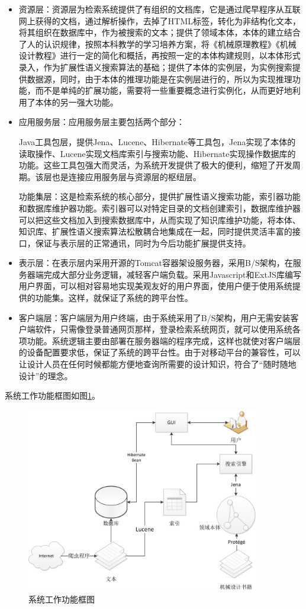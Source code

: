 \documentclass[12pt,a4paper]{article}
\begin{document}
	\begin{itemize}
	 	\item
	资源层：资源层为检索系统提供了有组织的文档库，它是通过爬早程序从互联网上获得的文档，通过解析操作，去掉了HTML标签，转化为非结构化文本，将其组织在数据库中，作为被搜索的文本；提供了领域本体，本体的建立结合了人的认识规律，按照本科教学的学习培养方案，将《机械原理教程》《机械设计教程》进行一定的简化和概括，再按照一定的本体构建规则，以本体形式录入，作为扩展性语义搜索算法的基础；提供了本体的实例层，为实例搜索提供数据源，同时，由于本体的推理功能是在实例层进行的，所以为实现推理功能，而不是单纯的扩展功能，需要将一些重要概念进行实例化，从而更好地利用了本体的另一强大功能。
		\item
	应用服务层：应用服务层主要包括两个部分：
	
	Java工具包层，提供Jena、Lucene、Hibernate等工具包，Jena实现了本体的读取操作、Lucene实现文档库索引与搜索功能、Hibernate实现操作数据库的功能。这些工具包强大而灵活，为系统开发提供了极大的便利，缩短了开发周期。该层也是连接应用服务层与资源层的枢纽层。
	
	功能集层：这是检索系统的核心部分，提供扩展性语义搜索功能，索引器功能和数据库维护器功能。索引器可以对特定目录的文档创建索引，数据库维护器可以把这些文档加入到搜索数据库中，从而实现了知识库维护功能，将本体、知识库、扩展性语义搜索算法松散耦合地集成在一起，同时提供灵活丰富的接口，保证与表示层的正常通讯，同时为今后功能扩展提供支持。
		\item
	表示层：在表示层内采用开源的Tomcat容器架设服务器，采用B/S架构，在服务器端完成大部分业务逻辑，减轻客户端负载。采用Javascript和ExtJS库编写用户界面，可以相对容易地实现美观友好的用户界面，使用户便于使用系统提供的功能集。这样，就保证了系统的跨平台性。
		\item
	客户端层：客户端层为用户终端，由于系统采用了B/S架构，用户无需安装客户端软件，只需像登录普通网页那样，登录检索系统网页，就可以使用系统各项功能。系统逻辑主要由部署在服务器端的程序完成，这样也就使对客户端层的设备配置要求低，保证了系统的跨平台性。由于对移动平台的兼容性，可以让设计人员在任何时候都能方便地查询所需要的设计知识，符合了“随时随地设计”的理念。
	
	\end{itemize}
	
	系统工作功能框图如图\ref{fig:功能框图}。
	
	\begin{figure}[htbp] 
	\centering\includegraphics[width=4in]{fig/功能框图.jpg} 
	\caption{系统工作功能框图}\label{fig:功能框图} 
	\end{figure} 
	
\end{document}
